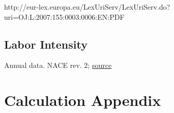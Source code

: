 \documentclass[11pt]{article}
\begin{document}
http://eur-lex.europa.eu/LexUriServ/LexUriServ.do?uri=OJ:L:2007:155:0003:0006:EN:PDF

\subsection{Labor Intensity} %
\label{sub:labor_intensity}

Annual data.  NACE rev. 2; \href{http://appsso.eurostat.ec.europa.eu/nui/show.do?dataset=sts_inlb_a&lang=en}{source}

\section{Calculation Appendix}
\label{sec:calculation_appendix}





\end{document}
